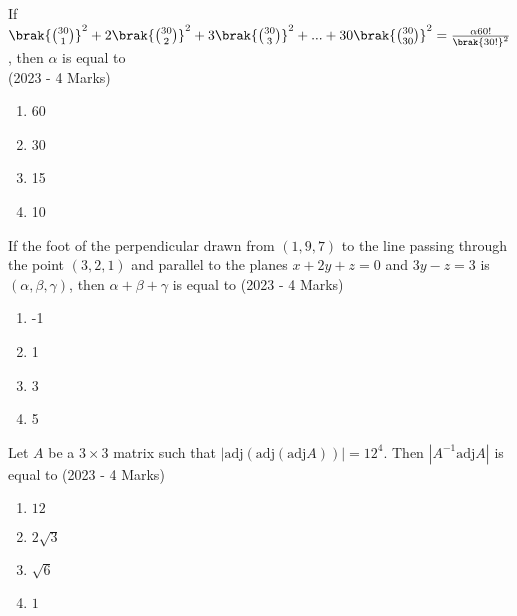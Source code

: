  	\item{
			If $\brak{\binom{30}{1}}^2 + 2\brak{\binom{30}{2}}^2+ 3\brak{\binom{30}{3}}^2 + ... + 30\brak{\binom{30}{30}}^2 = \frac{\alpha 60!}{\brak{30!}^2}$, then $\alpha$ is equal to \\
			\text{ }
			\hfill
			{(2023 - 4 Marks)}
			
			\begin{multicols}{4}
				\begin{enumerate}
					\item 60
					\item 30
					\item 15
					\item 10
				\end{enumerate}
			\end{multicols}
			
		}
 	\item{
			If the foot of the perpendicular drawn from $(1, 9, 7)$
			to the line passing through the point $(3, 2, 1)$ and
			parallel to the planes $x + 2y + z = 0$ and $3y - z = 3$
			is $(\alpha, \beta, \gamma)$, then $\alpha + \beta + \gamma$ is equal to\hfill
			{(2023 - 4 Marks)}
			
			\begin{multicols}{4}
				\begin{enumerate}
					\item -1
					\item 1
					\item 3
					\item 5
				\end{enumerate}
			\end{multicols}
			
		}
    \item{
          	Let $A$ be a $3 \times 3$ matrix such that $|\text{adj} (\text{adj} (\text{adj} A))| = 12^4$. Then $|A^{-1} \text{adj} A|$ is equal to
             \text{ }
             \hfill
                {(2023 - 4 Marks)}
            \begin{multicols}{4}
                \begin{enumerate}
                	\item $12$
                	\item $2\sqrt{3}$
                	\item $\sqrt{6}$
                	\item $1$
                \end{enumerate}
            \end{multicols}

        
        }
